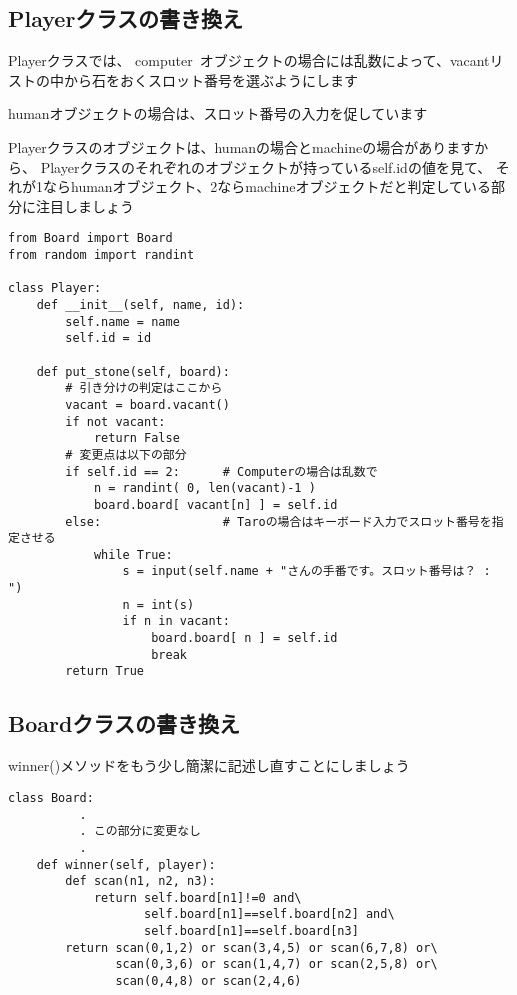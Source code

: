 \documentclass[uplatex,a4paper,11pt,oneside,openany]{jsbook}
\begin{document}
\subsection{Playerクラスの書き換え}

Playerクラスでは、
computer オブジェクトの場合には乱数によって、vacantリストの中から石をおくスロット番号を選ぶようにします

humanオブジェクトの場合は、スロット番号の入力を促しています

Playerクラスのオブジェクトは、humanの場合とmachineの場合がありますから、
Playerクラスのそれぞれのオブジェクトが持っているself.idの値を見て、
それが1ならhumanオブジェクト、2ならmachineオブジェクトだと判定している部分に注目しましょう

\begin{lstlisting}[caption=class Player,label=prog04-2]
from Board import Board
from random import randint

class Player:
    def __init__(self, name, id):
        self.name = name
        self.id = id

    def put_stone(self, board):
        # 引き分けの判定はここから
        vacant = board.vacant()
        if not vacant:
            return False
        # 変更点は以下の部分
        if self.id == 2:      # Computerの場合は乱数で
            n = randint( 0, len(vacant)-1 )
            board.board[ vacant[n] ] = self.id
        else:                 # Taroの場合はキーボード入力でスロット番号を指定させる
            while True:
                s = input(self.name + "さんの手番です。スロット番号は？ : ")
                n = int(s)
                if n in vacant:
                    board.board[ n ] = self.id
                    break
        return True
\end{lstlisting}%

\subsection{Boardクラスの書き換え}

winner()メソッドをもう少し簡潔に記述し直すことにしましょう

\begin{lstlisting}[caption=class Board,label=prog04-3]
class Board:
          .
          . この部分に変更なし
          .
    def winner(self, player):
        def scan(n1, n2, n3):
            return self.board[n1]!=0 and\
                   self.board[n1]==self.board[n2] and\
                   self.board[n1]==self.board[n3]
        return scan(0,1,2) or scan(3,4,5) or scan(6,7,8) or\
               scan(0,3,6) or scan(1,4,7) or scan(2,5,8) or\
               scan(0,4,8) or scan(2,4,6)
\end{lstlisting}%


%
\begin{thebibliography}{99}
  \bibitem{1}
\end{thebibliography}
%
\end{document}
